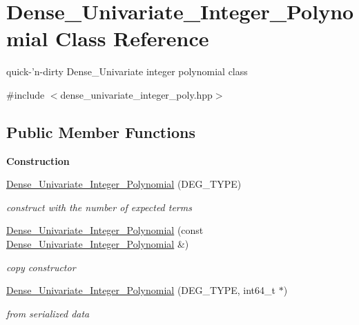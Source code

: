 \hypertarget{class_dense___univariate___integer___polynomial}{}\section{Dense\+\_\+\+Univariate\+\_\+\+Integer\+\_\+\+Polynomial Class Reference}
\label{class_dense___univariate___integer___polynomial}


quick-\/'n-\/dirty Dense\+\_\+\+Univariate integer polynomial class  




{\ttfamily \#include $<$dense\+\_\+univariate\+\_\+integer\+\_\+poly.\+hpp$>$}

\subsection*{Public Member Functions}
\begin{Indent}\textbf{ Construction}\par
\begin{DoxyCompactItemize}
\item 
\mbox{\label{class_dense___univariate___integer___polynomial_aefc915a9455b4f1512415c2a31a78eb5}} 
\hyperlink{class_dense___univariate___integer___polynomial_aefc915a9455b4f1512415c2a31a78eb5}{Dense\+\_\+\+Univariate\+\_\+\+Integer\+\_\+\+Polynomial} (D\+E\+G\+\_\+\+T\+Y\+PE)
\begin{DoxyCompactList}\small\item\em construct with the number of expected terms \end{DoxyCompactList}\item 
\mbox{\label{class_dense___univariate___integer___polynomial_a412c4aac4dbcf8512294e3ec1c7dd32f}} 
\hyperlink{class_dense___univariate___integer___polynomial_a412c4aac4dbcf8512294e3ec1c7dd32f}{Dense\+\_\+\+Univariate\+\_\+\+Integer\+\_\+\+Polynomial} (const \hyperlink{class_dense___univariate___integer___polynomial}{Dense\+\_\+\+Univariate\+\_\+\+Integer\+\_\+\+Polynomial} \&)
\begin{DoxyCompactList}\small\item\em copy constructor \end{DoxyCompactList}\item 
\mbox{\label{class_dense___univariate___integer___polynomial_a7791b2856ef361875ba1a9f08700dcad}} 
\hyperlink{class_dense___univariate___integer___polynomial_a7791b2856ef361875ba1a9f08700dcad}{Dense\+\_\+\+Univariate\+\_\+\+Integer\+\_\+\+Polynomial} (D\+E\+G\+\_\+\+T\+Y\+PE, int64\+\_\+t $\ast$)
\begin{DoxyCompactList}\small\item\em from serialized data \end{DoxyCompactList}\end{DoxyCompactItemize}
\end{Indent}
